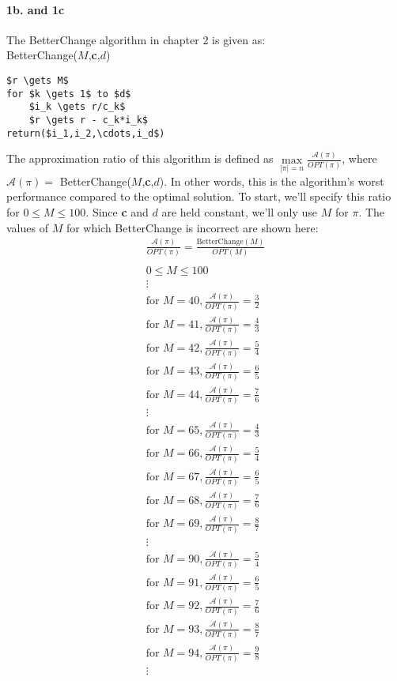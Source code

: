 \documentclass[12pt]{amsart}
\begin{document}
\paragraph{1b. and 1c}
The BetterChange algorithm in chapter 2 is given as:\\
BetterChange($M$,\textbf{c},$d$)
\begin{lstlisting}[mathescape=true]
$r \gets M$
for $k \gets 1$ to $d$
	$i_k \gets r/c_k$
	$r \gets r - c_k*i_k$
return($i_1,i_2,\cdots,i_d$)
\end{lstlisting}
The approximation ratio of this algorithm is defined as $\max\limits_{|\pi|=n}\frac{\mathcal{A}(\pi)}{OPT(\pi)}$, where $\mathcal{A}(\pi)=$ BetterChange($M$,\textbf{c},$d$).  In other words, this is the algorithm's worst performance compared to the optimal solution.  To start, we'll specify this ratio for $0 \leq M \leq 100$.  Since \textbf{c} and $d$ are held constant, we'll only use $M$ for $\pi$. The values of $M$ for which BetterChange is incorrect are shown here:\\
\begin{eqnarray*}
\frac{\mathcal{A}(\pi)}{OPT(\pi)}=\frac{\text{BetterChange}(M)}{OPT(M)}\\
 \\
0 \leq M \leq 100\\
\vdots\\
\text{for } M=40, \frac{\mathcal{A}(\pi)}{OPT(\pi)}=\frac{3}{2}\\
\text{for } M=41, \frac{\mathcal{A}(\pi)}{OPT(\pi)}=\frac{4}{3}\\
\text{for } M=42, \frac{\mathcal{A}(\pi)}{OPT(\pi)}=\frac{5}{4}\\
\text{for } M=43, \frac{\mathcal{A}(\pi)}{OPT(\pi)}=\frac{6}{5}\\
\text{for } M=44, \frac{\mathcal{A}(\pi)}{OPT(\pi)}=\frac{7}{6}\\
\vdots\\
\text{for } M=65, \frac{\mathcal{A}(\pi)}{OPT(\pi)}=\frac{4}{3}\\
\text{for } M=66, \frac{\mathcal{A}(\pi)}{OPT(\pi)}=\frac{5}{4}\\
\text{for } M=67, \frac{\mathcal{A}(\pi)}{OPT(\pi)}=\frac{6}{5}\\
\text{for } M=68, \frac{\mathcal{A}(\pi)}{OPT(\pi)}=\frac{7}{6}\\
\text{for } M=69, \frac{\mathcal{A}(\pi)}{OPT(\pi)}=\frac{8}{7}\\
\vdots\\
\text{for } M=90, \frac{\mathcal{A}(\pi)}{OPT(\pi)}=\frac{5}{4}\\
\text{for } M=91, \frac{\mathcal{A}(\pi)}{OPT(\pi)}=\frac{6}{5}\\
\text{for } M=92, \frac{\mathcal{A}(\pi)}{OPT(\pi)}=\frac{7}{6}\\
\text{for } M=93, \frac{\mathcal{A}(\pi)}{OPT(\pi)}=\frac{8}{7}\\
\text{for } M=94, \frac{\mathcal{A}(\pi)}{OPT(\pi)}=\frac{9}{8}\\
\vdots\\
\end{eqnarray*}
\end{document}
